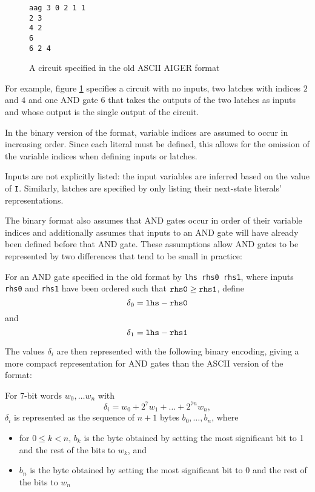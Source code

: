 \documentclass[12pt,a4paper,twoside,openright]{report}
\begin{document}
\begin{figure}[h]
\centering
\begin{verbatim}
aag 3 0 2 1 1
2 3
4 2
6
6 2 4
\end{verbatim}
\caption{
A circuit specified in the old ASCII AIGER format
}
\label{aagCircuit}
\end{figure}

For example, figure \ref{aagCircuit} specifies a circuit with
no inputs, two latches with indices $2$ and $4$ and one AND gate
$6$ that takes the outputs of the two latches as inputs and whose
output is the single output of the circuit.

In the binary version of the format, variable indices are assumed to
occur in increasing order. Since each literal must be defined, this allows
for the omission of the variable indices when defining inputs or latches.

Inputs are not explicitly listed: the input variables are inferred based on
the value of \verb,I,.
Similarly, latches are specified by only listing their next-state literals'
representations.

The binary format also assumes that AND gates occur in order of their
variable indices and additionally assumes that inputs to an AND gate will
have already been defined before that AND gate.
These assumptions allow AND gates to be represented by two differences
that tend to be small in practice:

For an AND gate specified in the old format by \verb,lhs rhs0 rhs1,,
where inputs \verb,rhs0, and \verb,rhs1, have been ordered such that
$\verb,rhs0, \geq \verb,rhs1,$, define
$$\delta_0 = \verb,lhs, - \verb,rhs0,$$
and
$$\delta_1 = \verb,lhs, - \verb,rhs1,$$

The values $\delta_i$ are then represented with the following binary
encoding, giving a more compact representation for AND gates than
the ASCII version of the format:

For 7-bit words $w_0, \ldots w_n$ with
$$\delta_i = w_0 + 2^7w_1 + \ldots + 2^{7n}w_n,$$
$\delta_i$ is represented as the sequence of $n + 1$ bytes
$b_0, \ldots, b_n$, where
\begin{itemize}
\item for $0 \leq k < n$, $b_k$ is the byte obtained by setting the most
significant bit to 1 and the rest of the bits to $w_k$, and
\item $b_n$ is the byte obtained by setting the most
significant bit to 0 and the rest of the bits to $w_n$
\end{itemize}
\end{document}
